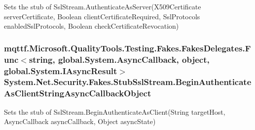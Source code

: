Sets the stub of Ssl\-Stream.\-Authenticate\-As\-Server(\-X509\-Certificate server\-Certificate, Boolean client\-Certificate\-Required, Ssl\-Protocols enabled\-Ssl\-Protocols, Boolean check\-Certificate\-Revocation)

\hypertarget{class_system_1_1_net_1_1_security_1_1_fakes_1_1_stub_ssl_stream_af1381c2a8cd701f74566e0631b9a04c4}{
\subsubsection[{Begin\-Authenticate\-As\-Client\-String\-Async\-Callback\-Object}]{\setlength{\rightskip}{0pt plus 5cm}mqttf.\-Microsoft.\-Quality\-Tools.\-Testing.\-Fakes.\-Fakes\-Delegates.\-Func$<$string, global.\-System.\-Async\-Callback, object, global.\-System.\-I\-Async\-Result$>$ System.\-Net.\-Security.\-Fakes.\-Stub\-Ssl\-Stream.\-Begin\-Authenticate\-As\-Client\-String\-Async\-Callback\-Object}}\label{class_system_1_1_net_1_1_security_1_1_fakes_1_1_stub_ssl_stream_af1381c2a8cd701f74566e0631b9a04c4}


Sets the stub of Ssl\-Stream.\-Begin\-Authenticate\-As\-Client(\-String target\-Host, Async\-Callback async\-Callback, Object async\-State)

